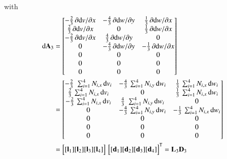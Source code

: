 with  
\begin{subequations}
	\begin{align}
	\mathrm{d} \mathbf{A}_3 & =  \begin{bmatrix}
		- \tfrac{2}{3} \, \partial \mathrm{d} v / \partial x &  - \tfrac{4}{3} \, \partial \mathrm{d} w / \partial y &  \tfrac{1}{3} \, \partial \mathrm{d} w / \partial x   \\
		\tfrac{2}{3} \, \partial \mathrm{d} v / \partial x &  0 & \tfrac{1}{3} \, \partial \mathrm{d} w / \partial x  \\
		- \tfrac{2}{3} \, \partial \mathrm{d} v / \partial x & \tfrac{4}{3} \, \partial \mathrm{d} w / \partial y & 0 \\
		0 &  - \tfrac{4}{3} \, \partial \mathrm{d} w / \partial y & - \tfrac{1}{3} \, \partial \mathrm{d} w / \partial x \\
		0 &  0 & 0  \\
		0 &  0 & 0  \\
		0 &  0 & 0  \end{bmatrix} \notag\\
	& = \begin{bmatrix}
		- \tfrac{2}{3} \, \, \sum\nolimits_{i=1}^4 N_{i,x} \, \mathrm{d} v_i &  - \tfrac{4}{3} \, \sum\nolimits_{i=1}^4 N_{i,y} \, \mathrm{d} w_i &  \tfrac{1}{3} \, \sum\nolimits_{i=1}^4 N_{i,x} \, \mathrm{d} w_i  \\
		\tfrac{2}{3} \, \sum\nolimits_{i=1}^4 N_{i,x} \, \mathrm{d} v_i &  0 & \tfrac{1}{3} \, \sum\nolimits_{i=1}^4 N_{i,x} \, \mathrm{d} w_i  \\
		- \tfrac{2}{3} \, \sum\nolimits_{i=1}^4 N_{i,x} \, \mathrm{d} v_i & \tfrac{4}{3} \, \, \sum\nolimits_{i=1}^4 N_{i,y} \, \mathrm{d} w_i & 0 \\
		0 &  - \tfrac{4}{3} \, \sum\nolimits_{i=1}^4 N_{i,y} \, \mathrm{d} w_i & - \tfrac{1}{3} \, \sum\nolimits_{i=1}^4 N_{i,x} \, \mathrm{d} w_i \\
		0 &  0 & 0  \\
		0 &  0 & 0  \\
		0 &  0 & 0  \end{bmatrix} \notag \\	
	& = \begin{bmatrix}
	[\mathbf{l}_1] [\mathbf{l}_2] [\mathbf{l}_3] [\mathbf{l}_4] 
	\end{bmatrix}  \, \begin{bmatrix} [\mathbf{d}_1] [\mathbf{d}_2] [\mathbf{d}_3] [\mathbf{d}_4] \end{bmatrix}^{\mathsf{T}}
= \mathbf{L}_3 \mathbf{D}_3 \\

\end{align}
\end{subequations}
